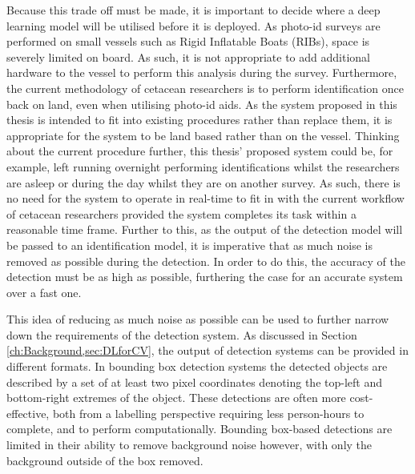  Because this trade off must be made, it is important to decide where a deep learning model will be utilised before it is deployed. As photo-id surveys are performed on small vessels such as Rigid Inflatable Boats (RIBs), space is severely limited on board. As such, it is not appropriate to add additional hardware to the vessel to perform this analysis during the survey. Furthermore, the current methodology of cetacean researchers is to perform identification once back on land, even when utilising photo-id aids. As the system proposed in this thesis is intended to fit into existing procedures rather than replace them, it is appropriate for the system to be land based rather than on the vessel. Thinking about the current procedure further, this thesis' proposed system could be, for example, left running overnight performing identifications whilst the researchers are asleep or during the day whilst they are on another survey. As such, there is no need for the system to operate in real-time to fit in with the current workflow of cetacean researchers provided the system completes its task within a reasonable time frame. Further to this, as the output of the detection model will be passed to an identification model, it is imperative that as much noise is removed as possible during the detection. In order to do this, the accuracy of the detection must be as high as possible, furthering the case for an accurate system over a fast one.
 
 This idea of reducing as much noise as possible can be used to further narrow down the requirements of the detection system. As discussed in Section \ref{ch:Background,sec:DLforCV}, the output of detection systems can be provided in different formats. In bounding box detection systems the detected objects are described by a set of at least two pixel coordinates denoting the top-left and bottom-right extremes of the object. These detections are often more cost-effective, both from a labelling perspective requiring less person-hours to complete, and to perform computationally. Bounding box-based detections are limited in their ability to remove background noise however, with only the background outside of the box removed.
 
